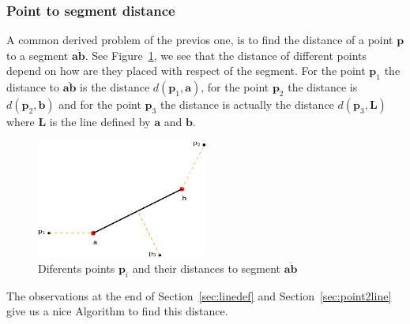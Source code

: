 \subsubsection{Point to segment distance}
\label{sec:point2segment}
A common derived problem of the previos one, is to find the distance of a point $\mathbf{p}$ to a segment $\overline{\mathbf{a}\mathbf{b}}$.
See Figure~\ref{fig:seg2point}, we see that the distance of different points depend on how are they placed with respect of the segment.
For the point $\mathbf{p}_1$ the distance to $\overline{\mathbf{a}\mathbf{b}}$ is the distance $d(\mathbf{p}_1, \mathbf{a})$, for the point $\mathbf{p}_2$ the distance is $d(\mathbf{p}_2, \mathbf{b})$ and for the point $\mathbf{p}_3$ the distance is actually the distance $d(\mathbf{p}_3, \mathbf{L})$ where $\mathbf{L}$ is the line defined by $\mathbf{a}$ and $\mathbf{b}$.

\begin{figure}[htb]
  \centering
  \includegraphics[width=0.50\textwidth]{img/segment2point}
  \caption{Diferents points $\mathbf{p}_i$ and their distances to segment $\overline{\mathbf{a}\mathbf{b}}$}
  \label{fig:seg2point}
\end{figure}

The observations at the end of Section~\ref{sec:linedef} and Section~\ref{sec:point2line} give us a nice Algorithm to find this distance.

